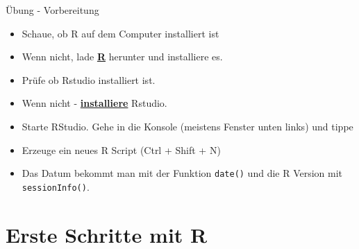 \documentclass[ignorenonframetext,]{beamer}
\begin{document}
\begin{frame}[fragile]{Übung - Vorbereitung}
\protect\hypertarget{ubung---vorbereitung}{}

\begin{itemize}
\item
  Schaue, ob R auf dem Computer installiert ist
\item
  Wenn nicht, lade \href{r-project.org}{\textbf{R}} herunter und
  installiere es.
\item
  Prüfe ob Rstudio installiert ist.
\item
  Wenn nicht - \href{http://www.rstudio.com/}{\textbf{installiere}}
  Rstudio.
\item
  Starte RStudio. Gehe in die Konsole (meistens Fenster unten links) und
  tippe
\item
  Erzeuge ein neues R Script (Ctrl + Shift + N)
\item
  Das Datum bekommt man mit der Funktion \texttt{date()} und die R
  Version mit \texttt{sessionInfo()}.
\end{itemize}

\end{frame}

\hypertarget{erste-schritte-mit-r}{%
\section{Erste Schritte mit R}\label{erste-schritte-mit-r}}
\end{document}
